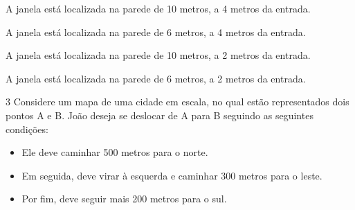 \begin{escolha}[itemsep=5pt]
\item A janela está localizada na parede de 10 metros, a 4 metros da
entrada.
\item A janela está localizada na parede de 6 metros, a 4 metros da
entrada.
\item A janela está localizada na parede de 10 metros, a 2 metros da
entrada.
\item A janela está localizada na parede de 6 metros, a 2 metros da
entrada.
\end{escolha}




\pagebreak
\num{3} Considere um mapa de uma cidade em escala, no qual estão
representados dois pontos A e B. João deseja se deslocar de A para B
seguindo as seguintes condições:

\begin{itemize}[itemsep=5pt]
\item Ele deve caminhar 500 metros para o norte. 
\item Em seguida, deve virar à esquerda e caminhar 300 metros para o leste. 
\item Por fim, deve seguir mais 200 metros para o sul.
\end{itemize}

